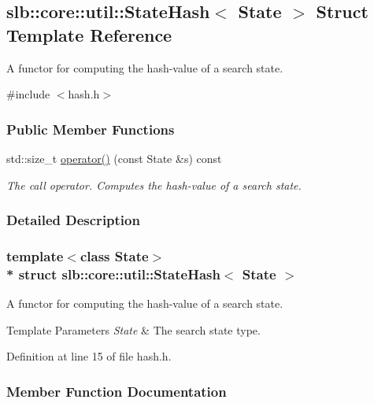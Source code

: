 \hypertarget{structslb_1_1core_1_1util_1_1StateHash}{}\subsection{slb\+:\+:core\+:\+:util\+:\+:State\+Hash$<$ State $>$ Struct Template Reference}
\label{structslb_1_1core_1_1util_1_1StateHash}


A functor for computing the hash-\/value of a search state.  




{\ttfamily \#include $<$hash.\+h$>$}

\subsubsection*{Public Member Functions}
\begin{DoxyCompactItemize}
\item 
std\+::size\+\_\+t \hyperlink{structslb_1_1core_1_1util_1_1StateHash_a4048ea07bfb087435633525018bd2ebe}{operator()} (const State \&s) const 
\begin{DoxyCompactList}\small\item\em The call operator. Computes the hash-\/value of a search state. \end{DoxyCompactList}\end{DoxyCompactItemize}


\subsubsection{Detailed Description}
\subsubsection*{template$<$class State$>$\\*
struct slb\+::core\+::util\+::\+State\+Hash$<$ State $>$}

A functor for computing the hash-\/value of a search state. 


\begin{DoxyTemplParams}{Template Parameters}
{\em State} & The search state type. \\
\hline
\end{DoxyTemplParams}


Definition at line 15 of file hash.\+h.



\subsubsection{Member Function Documentation}

